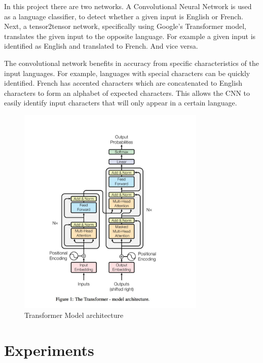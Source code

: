 \documentclass[10pt,a4paper]{article}
\begin{document}
  In this project there are two networks. A Convolutional Neural Network is used as a language classifier, to detect whether a given input is English or French. Next, a tensor2tensor network, specifically using Google's Transformer model, translates the given input to the opposite language. For example a given input is identified as English and translated to French. And vice versa.
  
  The convolutional network benefits in accuracy from specific characteristics of the input languages. For example, languages with special characters can be quickly identified. French has accented characters which are concatenated to English characters to form an alphabet of expected characters. This allows the CNN to easily identify input characters that will only appear in a certain language.

\begin{figure}[H]
  \begin{center}
    \includegraphics[width=0.8\textwidth] {transformer.jpg}
    \caption{Transformer Model architecture}
  \end{center}
\end{figure}

\clearpage

\section{Experiments}
\end{document}
